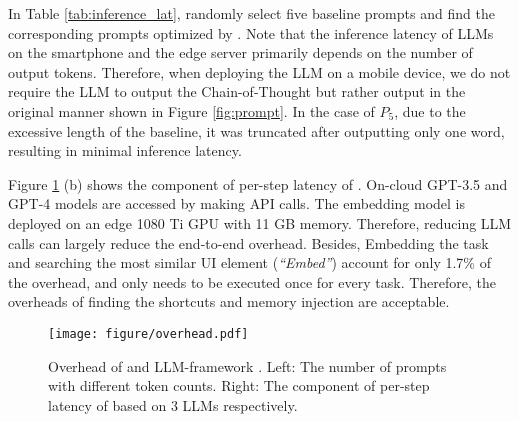 In Table \ref{tab:inference_lat},  randomly select five baseline prompts and find the corresponding prompts optimized by \name.  Note that the inference latency of LLMs on the smartphone and the edge server primarily depends on the number of output tokens. Therefore, when deploying the LLM on a mobile device, we do not require the LLM to output the Chain-of-Thought but rather output in the original manner shown in Figure \ref{fig:prompt}. In the case of \textit{$P_5$}, due to the excessive length of the baseline, it was truncated after outputting only one word, resulting in minimal inference latency.

Figure \ref{fig:prompt_length} (b) shows the component of per-step latency of \name. On-cloud GPT-3.5 and GPT-4 models are accessed by making API calls. The embedding model \cite{instructor-xl} is deployed on an edge 1080 Ti GPU with 11 GB memory.
Therefore, reducing LLM calls can largely reduce the end-to-end overhead. Besides, Embedding the task and searching the most similar UI element  (\textit{``Embed''}) account for only 1.7\% of the overhead, and only needs to be executed once for every task. Therefore, the overheads of finding the shortcuts and memory injection are acceptable.
\begin{figure}
    \centering
    \texttt{[image: figure/overhead.pdf]}
    \vspace{-0.7cm}
    \caption{Overhead of \name and LLM-framework \cite{talking_with_ui}. Left: The number of prompts with different token counts. Right: The component of per-step latency of \name based on 3 LLMs respectively.  }%
    \label{fig:prompt_length}
    \vspace{-0.3cm}
\end{figure}

